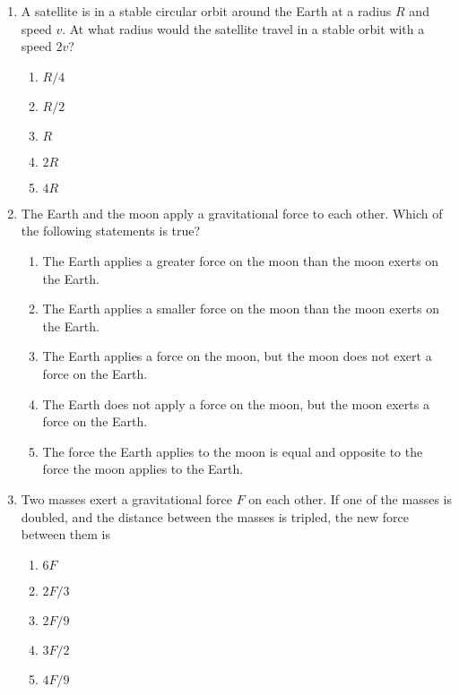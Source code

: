 \documentclass{../../../oss-apphys}
\begin{document}
\begin{multicols}{2}
\begin{enumerate}[leftmargin=18pt,resume]
  \item A satellite is in a stable circular orbit around the Earth at a radius
    $R$ and speed $v$. At what radius would the satellite travel in a stable
    orbit with a speed $2v$?
    \begin{enumerate}[nosep,leftmargin=18pt,label=(\Alph*)]
    \item $R/4$
    \item $R/2$
    \item $R$
    \item $2R$
    \item $4R$
    \end{enumerate}

  \item The Earth and the moon apply a gravitational force to each other. Which
    of the following statements is true?
    \begin{enumerate}[nosep,leftmargin=18pt,label=(\Alph*)]
    \item The Earth applies a greater force on the moon than the moon exerts on
      the Earth.
    \item The Earth applies a smaller force on the moon than the moon exerts on
      the Earth.
    \item The Earth applies a force on the moon, but the moon does not exert a
      force on the Earth.
    \item The Earth does not apply a force on the moon, but the moon exerts a
      force on the Earth.
    \item The force the Earth applies to the moon is equal and opposite to the
      force the moon applies to the Earth.
    \end{enumerate}
    \vspace{.8in}
    
  \item Two masses exert a gravitational force $F$ on each other. If one of the
    masses is doubled, and the distance between the masses is tripled, the
    new force between them is
    \begin{enumerate}[nosep,leftmargin=18pt,label=(\Alph*)]
    \item $6F$
    \item $2F/3$
    \item $2F/9$
    \item $3F/2$
    \item $4F/9$
    \end{enumerate}


\end{enumerate}
\end{multicols}
\end{document}
